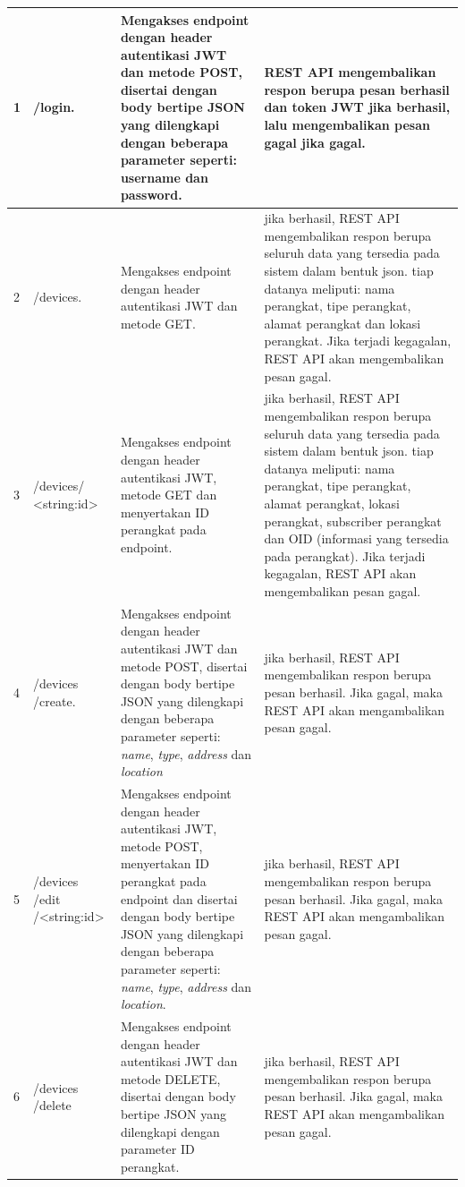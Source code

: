 \begin{longtable}{|p{}|p{}|p{}|p{}|}
            	1 & /login. & Mengakses endpoint dengan header autentikasi JWT dan metode POST, disertai dengan body bertipe JSON yang dilengkapi dengan beberapa parameter seperti: username dan password. & REST API mengembalikan respon berupa pesan berhasil dan token JWT jika berhasil, lalu mengembalikan pesan gagal jika gagal. \\ \hline
            	2 & /devices. & Mengakses endpoint dengan header autentikasi JWT dan metode GET. & jika berhasil, REST API mengembalikan respon berupa seluruh data yang tersedia pada sistem dalam bentuk json. tiap datanya meliputi: nama perangkat, tipe perangkat, alamat perangkat dan lokasi perangkat. Jika terjadi kegagalan, REST API akan mengembalikan pesan gagal. \\ \hline
            	3 & /devices/ <string:id> & Mengakses endpoint dengan header autentikasi JWT, metode GET dan menyertakan ID perangkat pada endpoint. & jika berhasil, REST API mengembalikan respon berupa seluruh data yang tersedia pada sistem dalam bentuk json. tiap datanya meliputi: nama perangkat, tipe perangkat, alamat perangkat, lokasi perangkat, subscriber perangkat dan OID (informasi yang tersedia pada perangkat). Jika terjadi kegagalan, REST API akan mengembalikan pesan gagal. \\ \hline
            	4 & /devices /create. & Mengakses endpoint dengan header autentikasi JWT dan metode POST, disertai dengan body bertipe JSON yang dilengkapi dengan beberapa parameter seperti: \textit{name}, \textit{type}, \textit{address} dan \textit{location} & jika berhasil, REST API mengembalikan respon berupa pesan berhasil. Jika gagal, maka REST API akan mengambalikan pesan gagal. \\ \hline
            	5 & /devices /edit /<string:id> & Mengakses endpoint dengan header autentikasi JWT, metode POST, menyertakan ID perangkat pada endpoint dan disertai dengan body bertipe JSON yang dilengkapi dengan beberapa parameter seperti: \textit{name}, \textit{type}, \textit{address} dan \textit{location}. & jika berhasil, REST API mengembalikan respon berupa pesan berhasil. Jika gagal, maka REST API akan mengambalikan pesan gagal. \\ \hline
            	6 & /devices /delete & Mengakses endpoint dengan header autentikasi JWT dan metode DELETE, disertai dengan body bertipe JSON yang dilengkapi dengan parameter ID perangkat. & jika berhasil, REST API mengembalikan respon berupa pesan berhasil. Jika gagal, maka REST API akan mengambalikan pesan gagal. \\ \hline

\end{longtable}
